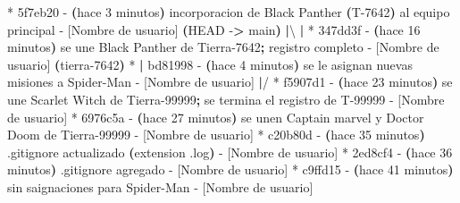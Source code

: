 \documentclass[
]{book}
\newenvironment{Shaded}{\begin{snugshade}}{\end{snugshade}}
\newcommand{\AttributeTok}[1]{\textcolor[rgb]{0.13,0.29,0.53}{#1}}
\newcommand{\ErrorTok}[1]{\textcolor[rgb]{0.64,0.00,0.00}{\textbf{#1}}}
\newcommand{\ExtensionTok}[1]{#1}
\newcommand{\KeywordTok}[1]{\textcolor[rgb]{0.13,0.29,0.53}{\textbf{#1}}}
\newcommand{\NormalTok}[1]{#1}
\newcommand{\OperatorTok}[1]{\textcolor[rgb]{0.81,0.36,0.00}{\textbf{#1}}}
\begin{document}
\begin{Shaded}
\begin{Highlighting}[]
\ExtensionTok{*}\NormalTok{   5f7eb20 }\AttributeTok{{-}} \ErrorTok{(}\ExtensionTok{hace}\NormalTok{ 3 minutos}\KeywordTok{)} \ExtensionTok{incorporacion}\NormalTok{ de Black Panther }\ErrorTok{(}\ExtensionTok{T{-}7642}\KeywordTok{)} \ExtensionTok{al}\NormalTok{ equipo principal }\AttributeTok{{-}}\NormalTok{ [Nombre de usuario] }\ErrorTok{(}\ExtensionTok{HEAD} \AttributeTok{{-}}\OperatorTok{\textgreater{}}\NormalTok{ main}\KeywordTok{)}
\KeywordTok{|}\ExtensionTok{\textbackslash{} } 
\KeywordTok{|} \ExtensionTok{*}\NormalTok{ 347dd3f }\AttributeTok{{-}} \ErrorTok{(}\ExtensionTok{hace}\NormalTok{ 16 minutos}\KeywordTok{)} \ExtensionTok{se}\NormalTok{ une Black Panther de Tierra{-}7642}\KeywordTok{;} \ExtensionTok{registro}\NormalTok{ completo }\AttributeTok{{-}}\NormalTok{ [Nombre de usuario] }\ErrorTok{(}\ExtensionTok{tierra{-}7642}\KeywordTok{)}
\ExtensionTok{*} \KeywordTok{|} \ExtensionTok{bd81998} \AttributeTok{{-}} \ErrorTok{(}\ExtensionTok{hace}\NormalTok{ 4 minutos}\KeywordTok{)} \ExtensionTok{se}\NormalTok{ le asignan nuevas misiones a Spider{-}Man }\AttributeTok{{-}}\NormalTok{ [Nombre de usuario]}
\KeywordTok{|}\ExtensionTok{/}  
\ExtensionTok{*}\NormalTok{ f5907d1 }\AttributeTok{{-}} \ErrorTok{(}\ExtensionTok{hace}\NormalTok{ 23 minutos}\KeywordTok{)} \ExtensionTok{se}\NormalTok{ une Scarlet Witch de Tierra{-}99999}\KeywordTok{;} \ExtensionTok{se}\NormalTok{ termina el registro de T{-}99999 }\AttributeTok{{-}}\NormalTok{ [Nombre de usuario]}
\ExtensionTok{*}\NormalTok{ 6976c5a }\AttributeTok{{-}} \ErrorTok{(}\ExtensionTok{hace}\NormalTok{ 27 minutos}\KeywordTok{)} \ExtensionTok{se}\NormalTok{ unen Captain marvel y Doctor Doom de Tierra{-}99999 }\AttributeTok{{-}}\NormalTok{ [Nombre de usuario]}
\ExtensionTok{*}\NormalTok{ c20b80d }\AttributeTok{{-}} \ErrorTok{(}\ExtensionTok{hace}\NormalTok{ 35 minutos}\KeywordTok{)} \ExtensionTok{.gitignore}\NormalTok{ actualizado }\ErrorTok{(}\ExtensionTok{extension}\NormalTok{ .log}\KeywordTok{)} \ExtensionTok{{-}}\NormalTok{ [Nombre de usuario]}
\ExtensionTok{*}\NormalTok{ 2ed8cf4 }\AttributeTok{{-}} \ErrorTok{(}\ExtensionTok{hace}\NormalTok{ 36 minutos}\KeywordTok{)} \ExtensionTok{.gitignore}\NormalTok{ agregado }\AttributeTok{{-}}\NormalTok{ [Nombre de usuario]}
\ExtensionTok{*}\NormalTok{ c9ffd15 }\AttributeTok{{-}} \ErrorTok{(}\ExtensionTok{hace}\NormalTok{ 41 minutos}\KeywordTok{)} \ExtensionTok{sin}\NormalTok{ saignaciones para Spider{-}Man }\AttributeTok{{-}}\NormalTok{ [Nombre de usuario]}

\end{Highlighting}
\end{Shaded}
\end{document}
